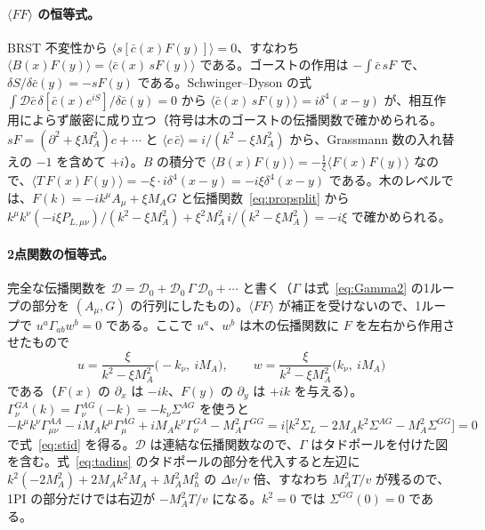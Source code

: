 \documentclass[a4paper,10pt]{ltjsarticle}
\begin{document}
\paragraph{$\langle FF\rangle$ の恒等式。}BRST 不変性から $\langle s[\bar c(x)F(y)]\rangle=0$、すなわち $\langle B(x)F(y)\rangle=\langle\bar c(x)\,sF(y)\rangle$ である。ゴーストの作用は $-\int\bar c\,sF$ で、$\delta S/\delta\bar c(y)=-sF(y)$ である。Schwinger--Dyson の式 $\int\mathcal D\bar c\,\delta[\bar c(x)e^{iS}]/\delta\bar c(y)=0$ から $\langle\bar c(x)\,sF(y)\rangle=i\delta^4(x-y)$ が、相互作用によらず厳密に成り立つ（符号は木のゴーストの伝播関数で確かめられる。$sF=(\partial^2+\xi M_A^2)c+\cdots$ と $\langle c\,\bar c\rangle=i/(k^2-\xi M_A^2)$ から、Grassmann 数の入れ替えの $-1$ を含めて $+i$）。$B$ の積分で $\langle B(x)F(y)\rangle=-\frac1\xi\langle F(x)F(y)\rangle$ なので、$\langle T\,F(x)F(y)\rangle=-\xi\cdot i\delta^4(x-y)=-i\xi\delta^4(x-y)$ である。木のレベルでは、$F(k)=-ik^\mu A_\mu+\xi M_AG$ と伝播関数~\eqref{eq:propsplit} から $k^\mu k^\nu(-i\xi P_{L,\mu\nu})/(k^2-\xi M_A^2)+\xi^2M_A^2\,i/(k^2-\xi M_A^2)=-i\xi$ で確かめられる。

\paragraph{2点関数の恒等式。}完全な伝播関数を $\mathcal D=\mathcal D_0+\mathcal D_0\,\Gamma\,\mathcal D_0+\cdots$ と書く（$\Gamma$ は式~\eqref{eq:Gamma2} の1ループの部分を $(A_\mu,G)$ の行列にしたもの）。$\langle FF\rangle$ が補正を受けないので、1ループで $u^a\Gamma_{ab}w^b=0$ である。ここで $u^a$、$w^b$ は木の伝播関数に $F$ を左右から作用させたもので
\begin{equation*}
u=\frac{\xi}{k^2-\xi M_A^2}\bigl(-k_\nu,\ iM_A\bigr),\qquad w=\frac{\xi}{k^2-\xi M_A^2}\bigl(k_\nu,\ iM_A\bigr)
\end{equation*}
である（$F(x)$ の $\partial_x$ は $-ik$、$F(y)$ の $\partial_y$ は $+ik$ を与える）。$\Gamma^{GA}_\nu(k)=\Gamma^{AG}_\nu(-k)=-k_\nu\Sigma^{AG}$ を使うと
\begin{equation*}
-k^\mu k^\nu\Gamma^{AA}_{\mu\nu}-iM_Ak^\mu\Gamma^{AG}_\mu+iM_Ak^\nu\Gamma^{GA}_\nu-M_A^2\Gamma^{GG}
=i\bigl[k^2\Sigma_L-2M_Ak^2\Sigma^{AG}-M_A^2\Sigma^{GG}\bigr]=0
\end{equation*}
で式~\eqref{eq:stid} を得る。$\mathcal D$ は連結な伝播関数なので、$\Gamma$ はタドポールを付けた図を含む。式~\eqref{eq:tadins} のタドポールの部分を代入すると左辺に $k^2(-2M_A^2)+2M_Ak^2M_A+M_A^2M_h^2$ の $\Delta v/v$ 倍、すなわち $M_A^2T/v$ が残るので、1PI の部分だけでは右辺が $-M_A^2T/v$ になる。$k^2=0$ では $\Sigma^{GG}(0)=0$ である。
\end{document}
